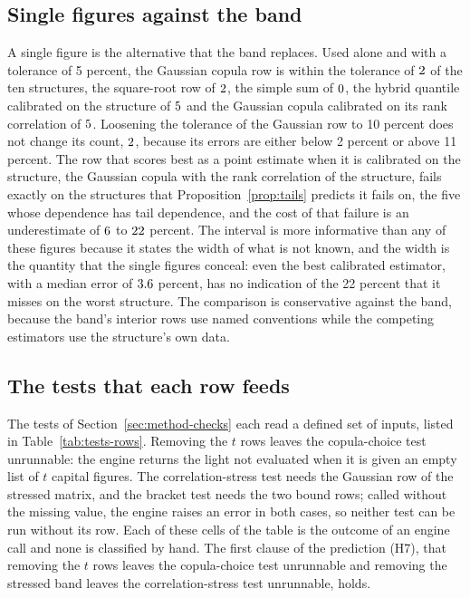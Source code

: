 \subsection{Single figures against the band}
\label{sec:ablation-single}

A single figure is the alternative that the band replaces. Used alone and with a tolerance of 5 percent, the Gaussian copula row
is within the tolerance of $2$ of the ten structures, the square-root row of $2$, the simple sum of
$0$, the hybrid quantile calibrated on the structure of $5$ and the Gaussian copula calibrated on its rank
correlation of $5$. Loosening the tolerance of the Gaussian row to 10 percent does not change its count,
$2$, because its errors are either below 2 percent or above 11 percent. The row that scores best as a point estimate when it
is calibrated on the structure, the Gaussian copula with the rank correlation of the structure, fails exactly on the structures
that Proposition~\ref{prop:tails} predicts it fails on, the five whose dependence has tail dependence, and the cost of that
failure is an underestimate of $6$ to $22$ percent. The interval is more informative than any of these figures because it states the
width of what is not known, and the width is the quantity that the single figures conceal: even the best calibrated estimator,
with a median error of $3.6$ percent, has no indication of the 22 percent that it misses on the worst structure.
The comparison is conservative against the band, because the band's interior rows use named conventions while the competing
estimators use the structure's own data.

\subsection{The tests that each row feeds}
\label{sec:ablation-tests}

The tests of Section~\ref{sec:method-checks} each read a defined set of inputs, listed in Table~\ref{tab:tests-rows}. Removing the
$t$ rows leaves the copula-choice test unrunnable: the engine returns the light not evaluated when it is given an empty list of
$t$ capital figures. The correlation-stress test needs the Gaussian row of the stressed matrix, and the bracket test needs the two
bound rows; called without the missing value, the engine raises an error in both cases, so neither test can be run without its
row. Each of these cells of the table is the outcome of an engine call and none is classified by hand. The first clause of the
prediction (H7), that removing the $t$ rows leaves the copula-choice test unrunnable and removing the stressed band leaves the
correlation-stress test unrunnable, holds.

